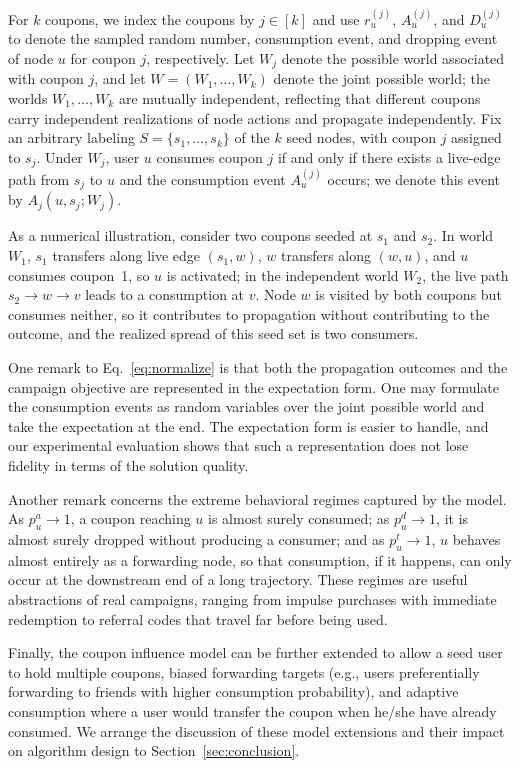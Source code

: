\documentclass[sigconf]{acmart}
\begin{document}
For $k$ coupons, we index the coupons by $j\in[k]$ and use
$r_u^{(j)}$, $A_u^{(j)}$, and $D_u^{(j)}$ to denote the sampled
random number, consumption event, and dropping event of node $u$ for
coupon $j$, respectively.
Let $W_j$ denote the possible world associated with coupon $j$, and
let $W=(W_1,\ldots,W_k)$ denote the joint possible world; the worlds
$W_1,\ldots,W_k$ are mutually independent, reflecting that different
coupons carry independent realizations of node actions and propagate
independently.
Fix an arbitrary labeling $S=\{s_1,\ldots,s_k\}$ of the $k$ seed
nodes, with coupon $j$ assigned to $s_j$.
Under $W_j$, user $u$ consumes coupon $j$ if and only if there exists
a live-edge path from $s_j$ to $u$ and the consumption event
$A_u^{(j)}$ occurs; we denote this event by $A_j(u,s_j;W_j)$.

\textcolor[rgb]{1.00,0.00,0.00}{As a numerical illustration, consider two coupons seeded at $s_1$
and $s_2$.
In world $W_1$, $s_1$ transfers along live edge $(s_1,w)$, $w$
transfers along $(w,u)$, and $u$ consumes coupon~1, so $u$ is
activated; in the independent world $W_2$, the live path
$s_2\to w\to v$ leads to a consumption at $v$.
Node $w$ is visited by both coupons but consumes neither, so it
contributes to propagation without contributing to the outcome, and
the realized spread of this seed set is two consumers.}


One remark to Eq.~\eqref{eq:normalize} is that both the propagation
outcomes and the campaign objective are represented in the expectation
form.
One may formulate the consumption events as random variables over the
joint possible world and take the expectation at the end.
The expectation form is easier to handle, and our experimental
evaluation shows that such a representation does not lose fidelity in
terms of the solution quality.

Another remark concerns the extreme behavioral regimes captured by
the model.
As $p_u^a\to 1$, a coupon reaching $u$ is almost surely consumed; as
$p_u^d\to 1$, it is almost surely dropped without producing a
consumer; and as $p_u^t\to 1$, $u$ behaves almost entirely as a
forwarding node, so that consumption, if it happens, can only occur
at the downstream end of a long trajectory.
These regimes are useful abstractions of real campaigns, ranging from
impulse purchases with immediate redemption to referral codes that
travel far before being used.

Finally, the coupon influence model can be further extended to allow
a seed user to hold multiple coupons, biased forwarding targets
(e.g., users preferentially forwarding to friends with higher
consumption probability), and adaptive consumption where a user would transfer the coupon when he/she have already consumed.
We arrange the discussion of these model extensions and their impact
on algorithm design to Section~\ref{sec:conclusion}.
\end{document}
